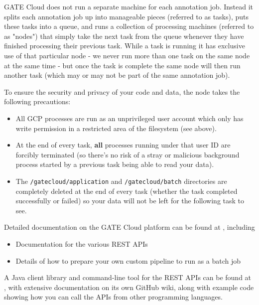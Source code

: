 GATE Cloud does not run a separate machine for each annotation job.  Instead
it splits each annotation job up into manageable pieces (referred to as tasks),
puts these tasks into a queue, and runs a collection of processing machines
(referred to as "nodes") that simply take the next task from the queue whenever
they have finished processing their previous task.  While a task is running it
has exclusive use of that particular node - we never run more than one task on
the same node at the same time - but once the task is complete the same node
will then run another task (which may or may not be part of the same annotation
job).

To ensure the security and privacy of your code and data, the node takes the
following precautions:

\begin{itemize}
\item All GCP processes are run as an unprivileged user account which only has
  write permission in a restricted area of the filesystem (see above).
\item At the end of every task, {\bf all} processes running under that user ID are
  forcibly terminated (so there's no risk of a stray or malicious background
  process started by a previous task being able to read your data).
\item The \verb^/gatecloud/application^ and \verb^/gatecloud/batch^ directories are
  completely deleted at the end of every task (whether the task completed
  successfully or failed) so your data will not be left for the following task
  to see.
\end{itemize}

\else %


Detailed documentation on the GATE Cloud platform can be found at
, including

\begin{itemize}
\item Documentation for the various REST APIs
\item Details of how to prepare your own custom pipeline to run as a batch job
\end{itemize}

A Java client library and command-line tool for the REST APIs can be found at
, with extensive
documentation on its own GitHub wiki, along with example code showing how you
can call the APIs from other programming languages.

